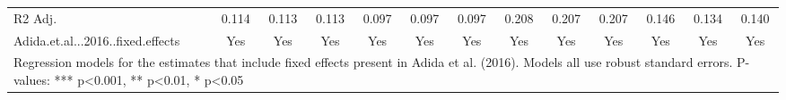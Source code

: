 \begin{table}[H]
\begin{tabular}[t]{lcccccccccccc}
R2 Adj. & \num{0.114} & \num{0.113} & \num{0.113} & \num{0.097} & \num{0.097} & \num{0.097} & \num{0.208} & \num{0.207} & \num{0.207} & \num{0.146} & \num{0.134} & \num{0.140}\\
Adida.et.al...2016..fixed.effects & Yes & Yes & Yes & Yes & Yes & Yes & Yes & Yes & Yes & Yes & Yes & Yes\\
\bottomrule
\multicolumn{13}{l}{\rule{0pt}{1em}Regression models for the estimates that include fixed effects present in Adida et al. (2016). Models all use robust standard errors. P-values: *** p<0.001, ** p<0.01, * p<0.05}\\
\end{tabular}
\end{table}
